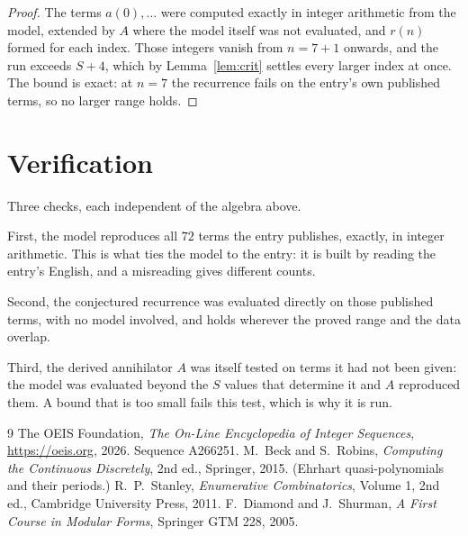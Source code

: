 \documentclass[11pt,a4paper]{article}
\theoremstyle{plain}
\theoremstyle{definition}
\begin{document}
\begin{proof}
The terms $a(0),\dots$ were computed exactly in integer arithmetic from the model, extended by
$A$ where the model itself was not evaluated, and $r(n)$ formed for each index. Those integers
vanish from $n=7+1$ onwards, and the run exceeds $S+4$, which by
Lemma~\ref{lem:crit} settles every larger index at once. The bound is exact: at $n=7$ the recurrence fails on the entry's own published terms, so no larger range holds.
\end{proof}

\section{Verification}

Three checks, each independent of the algebra above.

First, the model reproduces all $72$ terms the entry publishes, exactly, in integer
arithmetic. This is what ties the model to the entry: it is built by reading the entry's
English, and a misreading gives different counts.

Second, the conjectured recurrence was evaluated directly on those published terms, with no
model involved, and holds wherever the proved range and the data overlap.

Third, the derived annihilator $A$ was itself tested on terms it had not been given: the model
was evaluated beyond the $S$ values that determine it and $A$ reproduced them. A bound that is
too small fails this test, which is why it is run.

\begin{thebibliography}{9}
 The OEIS Foundation, \emph{The On-Line Encyclopedia of Integer
Sequences}, \url{https://oeis.org}, 2026. Sequence A266251.
 M.~Beck and S.~Robins, \emph{Computing the Continuous Discretely},
2nd ed., Springer, 2015. (Ehrhart quasi-polynomials and their periods.)
 R.~P.~Stanley, \emph{Enumerative Combinatorics}, Volume 1, 2nd ed.,
Cambridge University Press, 2011.
 F.~Diamond and J.~Shurman, \emph{A First Course in Modular Forms},
Springer GTM 228, 2005.
\end{thebibliography}
\end{document}
